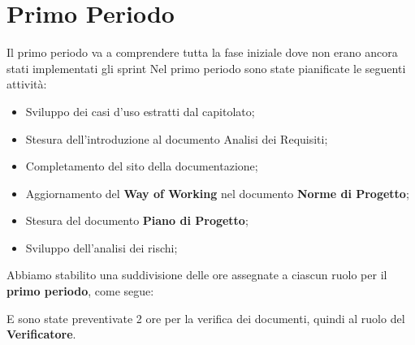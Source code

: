 \section{Primo Periodo}

\label{sec:PrimoPeriodo}
Il primo periodo va a comprendere tutta la fase iniziale dove non erano ancora stati implementati gli sprint
Nel primo periodo sono state pianificate le seguenti attività:
\begin{itemize}
    \item Sviluppo dei casi d'uso estratti dal capitolato;
    \item Stesura dell'introduzione al documento Analisi dei Requisiti;
    \item Completamento del sito della documentazione;
    \item Aggiornamento del \textbf{Way of Working} nel documento \textbf{Norme di Progetto};
    \item Stesura del documento \textbf{Piano di Progetto};
    \item Sviluppo dell'analisi dei rischi;
\end{itemize}

Abbiamo stabilito una suddivisione delle ore assegnate a ciascun ruolo per il \textbf{primo periodo}, come segue:  

\begin{table}[H]
    \centering
\end{table}
E sono state preventivate 2 ore per la verifica dei documenti, quindi al ruolo del \textbf{Verificatore}.

